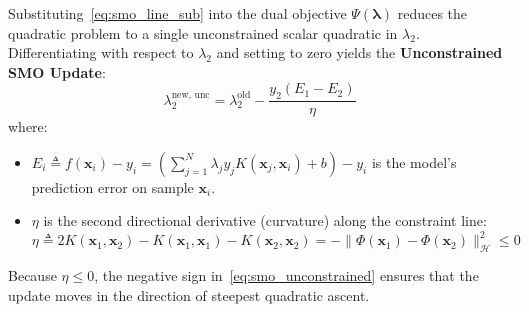 Substituting~\eqref{eq:smo_line_sub} into the dual objective $\Psi(\boldsymbol{\lambda})$ reduces the quadratic problem to a single unconstrained scalar quadratic in $\lambda_2$. Differentiating with respect to $\lambda_2$ and setting to zero yields the \textbf{Unconstrained SMO Update}:
\begin{equation}
\lambda_2^{\text{new, unc}} = \lambda_2^{\text{old}} - \frac{y_2(E_1 - E_2)}{\eta}
\label{eq:smo_unconstrained}
\end{equation}
where:
\begin{itemize}
    \item $E_i \triangleq f(\mathbf{x}_i) - y_i = \left( \sum_{j=1}^N \lambda_j y_j K(\mathbf{x}_j, \mathbf{x}_i) + b \right) - y_i$ is the model's prediction error on sample $\mathbf{x}_i$.
    \item $\eta$ is the second directional derivative (curvature) along the constraint line:
    \begin{equation}
    \eta \triangleq 2 K(\mathbf{x}_1, \mathbf{x}_2) - K(\mathbf{x}_1, \mathbf{x}_1) - K(\mathbf{x}_2, \mathbf{x}_2) = -\|\Phi(\mathbf{x}_1) - \Phi(\mathbf{x}_2)\|_{\mathcal{H}}^2 \le 0
    \end{equation}
\end{itemize}
Because $\eta \le 0$, the negative sign in~\eqref{eq:smo_unconstrained} ensures that the update moves in the direction of steepest quadratic ascent.

